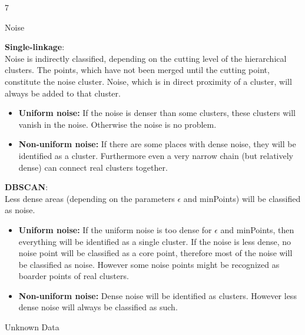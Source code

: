 \documentclass{article}
\begin{document}
\begin{ukon-infie}[12.12.17]{7}
\begin{exercise}[p=3]{Noise}
				
				\bigskip
						
			\textbf{Single-linkage}:\\
			Noise is indirectly classified, depending on the cutting level of the hierarchical clusters. The points, which have not been merged until the cutting point, constitute the noise cluster. Noise, which is in direct proximity of a cluster, will always be added to that cluster.
			\begin{itemize}
				 \item \textbf{Uniform noise:} If the noise is denser than some clusters, these clusters will vanish in the noise. Otherwise the noise is no problem.
				 \item \textbf{Non-uniform noise:} If there are some places with dense noise, they will be identified as a cluster. Furthermore even a very narrow chain (but relatively dense) can connect real clusters together.
			\end{itemize}
			
			\textbf{DBSCAN}:\\
			Less dense areas (depending on the parameters $\epsilon$ and minPoints) will be classified as noise.\\
			\begin{itemize}
				 \item \textbf{Uniform noise:} If the uniform noise is too dense for $\epsilon$ and minPoints, then everything will be identified as a single cluster. If the noise is less dense, no noise point will be classified as a core point, therefore most of the noise will be classified as noise. However some noise points might be recognized as boarder points of real clusters.
				 \item \textbf{Non-uniform noise:} Dense noise will be identified as clusters. However less dense noise will always be classified as such.
			\end{itemize}
			
			
		\end{exercise}
		
		\begin{exercise}[p=7]{Unknown Data}
		\end{exercise}
		
		
\end{ukon-infie}
\end{document}
